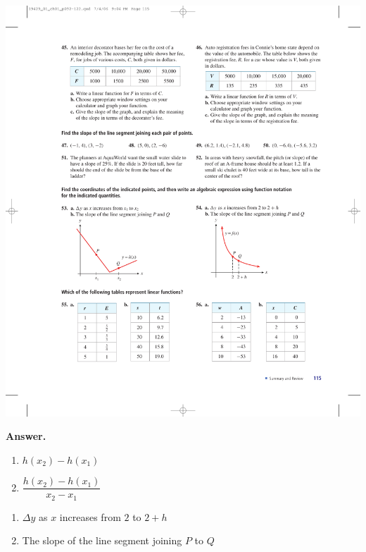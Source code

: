 \documentclass[10pt,]{book}
\theoremstyle{plain}
\theoremstyle{definition}
\theoremstyle{definition}
\theoremstyle{definition}
\theoremstyle{definition}
\numberwithin{equation}{part}
\begin{document}
\begin{exerciselist}
\begin{exercisegroup}
 \includegraphics[width=0.9\linewidth]{images/fig-chap1-rev-53}
%
\par\smallskip
\noindent\textbf{Answer.}\hypertarget{answer-248}{}\quad
\leavevmode%
\begin{enumerate}[label=*\alph**]
\item\hypertarget{li-1621}{}\(h(x_2) - h(x_1)\)%
\item\hypertarget{li-1622}{}\(\dfrac{h(x_2) - h(x_1)}{x_2 - x_1} \)%
\end{enumerate}
%
\exercise[54.]\hypertarget{exercise-450}{}\leavevmode%
\begin{enumerate}[label=*\alph**]
\item\hypertarget{li-1623}{}\(\Delta y\) as \(x\) increases from \(2\) to \(2+h\)%
\item\hypertarget{li-1624}{}The slope of the line segment joining \(P\) to \(Q\)%
\end{enumerate}

\end{exercisegroup}
\end{exerciselist}
\end{document}
